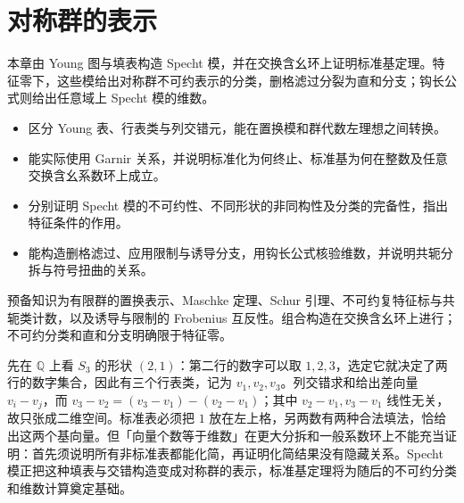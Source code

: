 \chapter{对称群的表示}
\label{b5:ch:06}

\begin{chapterabstract}
	本章由 Young 图与填表构造 Specht 模，并在交换含幺环上证明标准基定理。特征零下，这些模给出对称群不可约表示的分类，删格滤过分裂为直和分支；钩长公式则给出任意域上 Specht 模的维数。
\end{chapterabstract}

\begin{learninggoals}
	\begin{itemize}
		\item 区分 Young 表、行表类与列交错元，能在置换模和群代数左理想之间转换。
		\item 能实际使用 Garnir 关系，并说明标准化为何终止、标准基为何在整数及任意交换含幺系数环上成立。
		\item 分别证明 Specht 模的不可约性、不同形状的非同构性及分类的完备性，指出特征条件的作用。
		\item 能构造删格滤过、应用限制与诱导分支，用钩长公式核验维数，并说明共轭分拆与符号扭曲的关系。
	\end{itemize}
	预备知识为有限群的置换表示、Maschke 定理、Schur 引理、不可约复特征标与共轭类计数，以及诱导与限制的 Frobenius 互反性。组合构造在交换含幺环上进行；不可约分类和直和分支明确限于特征零。
\end{learninggoals}

先在 \(\mathbb Q\) 上看 \(S_3\) 的形状 \((2,1)\)：第二行的数字可以取 \(1,2,3\)，选定它就决定了两行的数字集合，因此有三个行表类，记为 \(v_1,v_2,v_3\)。列交错求和给出差向量 \(v_i-v_j\)，而 \(v_3-v_2=(v_3-v_1)-(v_2-v_1)\)；其中 \(v_2-v_1,v_3-v_1\) 线性无关，故只张成二维空间。标准表必须把 \(1\) 放在左上格，另两数有两种合法填法，恰给出这两个基向量。但「向量个数等于维数」在更大分拆和一般系数环上不能充当证明：首先须说明所有非标准表都能化简，再证明化简结果没有隐藏关系。Specht 模正把这种填表与交错构造变成对称群的表示，标准基定理将为随后的不可约分类和维数计算奠定基础。








